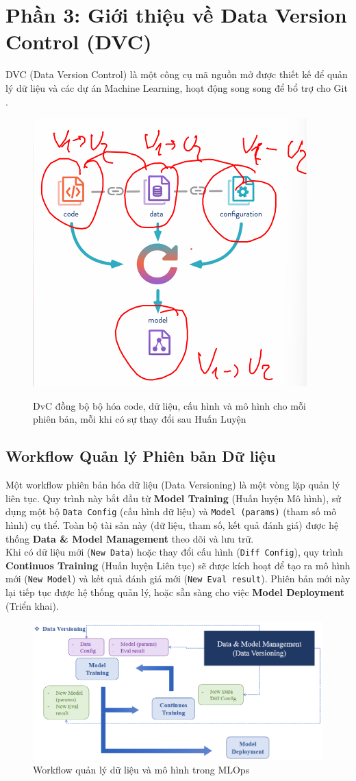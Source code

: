 \documentclass[11pt]{article}
\begin{document}
\section{Phần 3: Giới thiệu về Data Version Control (DVC)}
DVC (Data Version Control) là một công cụ mã nguồn mở được thiết kế để quản lý dữ liệu và các dự án Machine Learning, hoạt động song song để bổ trợ cho Git \cite{dvc_org_website}.
\begin{figure}[H]
    \centering
    \includegraphics[width=0.4\linewidth]{images/vs_dvc.png} \\
    \caption{DvC đồng bộ bộ hóa code, dữ liệu, cấu hình và mô hình cho mỗi phiên bản, mỗi khi có sự thay đổi sau Huấn Luyện}
\end{figure}

\subsection{Workflow Quản lý Phiên bản Dữ liệu}
Một workflow phiên bản hóa dữ liệu (Data Versioning) là một vòng lặp quản lý liên tục. Quy trình này bắt đầu từ \textbf{Model Training} (Huấn luyện Mô hình), sử dụng một bộ \texttt{Data Config} (cấu hình dữ liệu) và \texttt{Model (params)} (tham số mô hình) cụ thể. Toàn bộ tài sản này (dữ liệu, tham số, kết quả đánh giá) được hệ thống \textbf{Data \& Model Management} theo dõi và lưu trữ. \\

Khi có dữ liệu mới (\texttt{New Data}) hoặc thay đổi cấu hình (\texttt{Diff Config}), quy trình \textbf{Continuos Training} (Huấn luyện Liên tục) sẽ được kích hoạt để tạo ra mô hình mới (\texttt{New Model}) và kết quả đánh giá mới (\texttt{New Eval result}). Phiên bản mới này lại tiếp tục được hệ thống quản lý, hoặc sẵn sàng cho việc \textbf{Model Deployment} (Triển khai).

\begin{figure}[H]
    \centering
    \includegraphics[width=0.8\linewidth]{images/dv_managements.png}
    \caption{Workflow quản lý dữ liệu và mô hình trong MLOps}
\end{figure}
\end{document}
